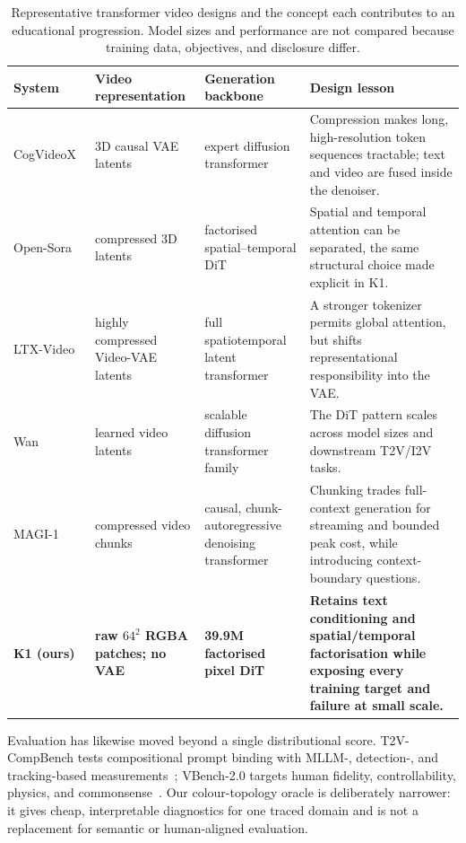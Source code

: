 \documentclass[10pt,twocolumn]{article}
\begin{document}
\begin{table}[t]\centering
\caption{Representative transformer video designs and the concept each contributes to an educational progression.
Model sizes and performance are not compared because training data, objectives, and disclosure differ.}
\label{tab:modern}\scriptsize
\begin{tabular}{@{}>{\raggedright\arraybackslash}p{}>{\raggedright\arraybackslash}p{}>{\raggedright\arraybackslash}p{}>{\raggedright\arraybackslash}p{}@{}}\toprule
System & Video representation & Generation backbone & Design lesson \\\midrule
CogVideoX~\cite{yang2024cogvideox} & 3D causal VAE latents & expert diffusion transformer & Compression makes long, high-resolution token sequences tractable; text and video are fused inside the denoiser. \\
Open-Sora~\cite{zheng2024opensora} & compressed 3D latents & factorised spatial--temporal DiT & Spatial and temporal attention can be separated, the same structural choice made explicit in K1. \\
LTX-Video~\cite{hacohen2025ltx} & highly compressed Video-VAE latents & full spatiotemporal latent transformer & A stronger tokenizer permits global attention, but shifts representational responsibility into the VAE. \\
Wan~\cite{wan2025} & learned video latents & scalable diffusion transformer family & The DiT pattern scales across model sizes and downstream T2V/I2V tasks. \\
MAGI-1~\cite{magi2025} & compressed video chunks & causal, chunk-autoregressive denoising transformer & Chunking trades full-context generation for streaming and bounded peak cost, while introducing context-boundary questions. \\
\textbf{K1 (ours)} & \textbf{raw $64^2$ RGBA patches; no VAE} & \textbf{39.9M factorised pixel DiT} & \textbf{Retains text conditioning and spatial/temporal factorisation while exposing every training target and failure at small scale.} \\\bottomrule
\end{tabular}
\end{table}

Evaluation has likewise moved beyond a single distributional score. T2V-CompBench tests compositional prompt binding
with MLLM-, detection-, and tracking-based measurements~\cite{sun2025compbench}; VBench-2.0 targets human fidelity,
controllability, physics, and commonsense~\cite{zheng2025vbench2}. Our colour-topology oracle is deliberately narrower:
it gives cheap, interpretable diagnostics for one traced domain and is not a replacement for semantic or human-aligned
evaluation.
\end{document}
